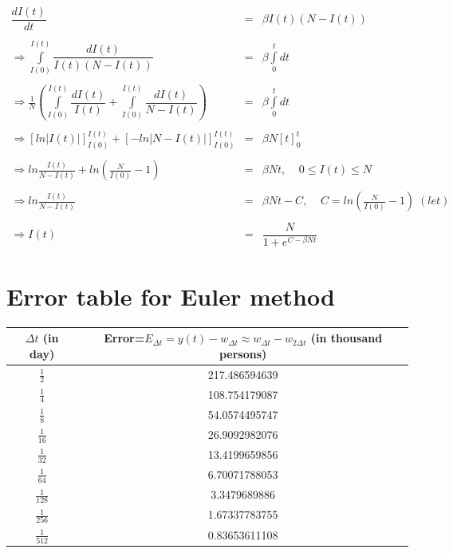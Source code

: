 \documentclass[11pt, a4paper, twoside]{report}
\begin{document}
\begin{equation*}
\begin{array}{rcl} 
\dfrac{dI(t)}{dt} & = & \beta I(t)(N-I(t)) \\\\
\Rightarrow \int\limits_{I(0)}^{I(t)}\dfrac{dI(t)}{I(t)(N-I(t))} & = & \beta \int\limits_{0}^{t}dt \\\\
\Rightarrow \frac{1}{N}\left(\int\limits_{I(0)}^{I(t)}\dfrac{dI(t)}{I(t)} + \int\limits_{I(0)}^{I(t)}\dfrac{dI(t)}{N-I(t)}\right) & = & \beta \int\limits_{0}^{t}dt \\\\
\Rightarrow \left[ln|I(t)|\right]_{I(0)}^{I(t)} + \left[-ln|N-I(t)|\right]_{I(0)}^{I(t)} & = & \beta N [t]_{0}^{t} \\\\
\Rightarrow ln\frac{I(t)}{N-I(t)} + ln\left(\frac{N}{I(0)}-1\right) & = & \beta N t, \;\;\;\; 0 \leq I(t) \leq N\\\\
\Rightarrow ln\frac{I(t)}{N-I(t)} & = & \beta N t - C, \;\;\;\;  C = ln\left(\frac{N}{I(0)}-1\right)\; (let)\\\\
\Rightarrow I(t)  & = & \dfrac{N}{1+e^{C-\beta N t}}
\end{array}
\end{equation*}

\chapter{Error table for Euler method} 

\begin{table}[h!]
  \begin{tabular}{ | c | c | }
    \hline
    $\Delta t$ (in day) &  Error=$E_{\Delta t}=y(t)-w_{\Delta t} \approx w_{\Delta t}-w_{2\Delta t}$ (in thousand persons) \\ \hline
    $\frac{1}{2}$   &    217.486594639 \\ \hline
    $\frac{1}{4}$   &    108.754179087 \\ \hline
    $\frac{1}{8}$   &    54.0574495747 \\ \hline
    $\frac{1}{16}$   &    26.9092982076 \\ \hline
    $\frac{1}{32}$  &    13.4199659856 \\ \hline
    $\frac{1}{64}$  &    6.70071788053 \\ \hline
    $\frac{1}{128}$  &    3.3479689886 \\ \hline
    $\frac{1}{256}$ &    1.67337783755 \\ \hline
    $\frac{1}{512}$ &    0.83653611108 \\ \hline
    \hline
  \end{tabular}
\end{table}
\end{document}
